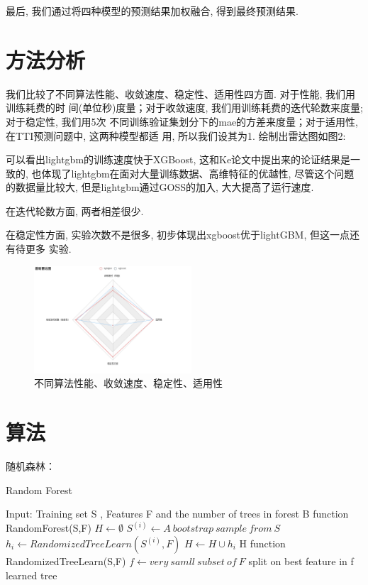 \documentclass[a4paper,UTF8]{article}
\begin{document}
最后, 我们通过将四种模型的预测结果加权融合, 得到最终预测结果. 

\section{方法分析}
我们比较了不同算法性能、收敛速度、稳定性、适用性四方面. 对于性能, 我们用训练耗费的时
间(单位秒)度量；对于收敛速度, 我们用训练耗费的迭代轮数来度量; 对于稳定性, 我们用5次
不同训练验证集划分下的mae的方差来度量；对于适用性, 在TTI预测问题中, 这两种模型都适
用, 所以我们设其为1. 绘制出雷达图如图2:

可以看出lightgbm的训练速度快于XGBoost, 这和Ke\cite{ref3}论文中提出来的论证结果是一致的, 
也体现了lightgbm在面对大量训练数据、高维特征的优越性, 尽管这个问题的数据量比较大, 
但是lightgbm通过GOSS的加入, 大大提高了运行速度. 

在迭代轮数方面, 两者相差很少. 

在稳定性方面, 实验次数不是很多, 初步体现出xgboost优于lightGBM, 但这一点还有待更多
实验. 

\begin{figure}[!htbp]
	\centering
	\includegraphics[height=4cm]{rader}
	\caption{不同算法性能、收敛速度、稳定性、适用性}
\end{figure}

\section{算法}
随机森林：
\begin{algorithm}[H]
  \caption{Random Forest}
  \begin{algorithmic}
      \STATE Input: Training set S , Features F and the number of trees in forest B
      \STATE function RandomForest(S,F)
        \STATE $H \leftarrow \emptyset$
          \STATE $S^{(i)} \leftarrow A \  bootstrap \ sample \  from \ S$
          \STATE $h_i \leftarrow RandomizedTreeLearn(S^{(i)},F)$
          \STATE $H \leftarrow H \cup {h_i}$
        \ENDFOR
        \RETURN H
      \STATE function RandomizedTreeLearn(S,F)
          \STATE $f \leftarrow very \ samll \ subset \ of \ F$
          \STATE split on best feature in f
        \ENDFOR
      \RETURN learned tree   
  \end{algorithmic}
\end{algorithm}
\end{document}
